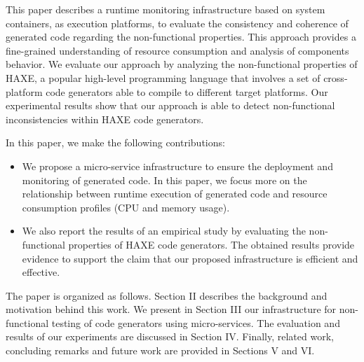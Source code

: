 This paper describes a runtime monitoring infrastructure based on system containers, as execution platforms, to evaluate the consistency and coherence of generated code regarding the non-functional properties. This approach provides a fine-grained understanding of resource consumption and analysis of components behavior. 
We evaluate our approach by analyzing the non-functional properties of HAXE, a popular high-level programming language that involves a set of cross-platform code generators able to compile to different target platforms. Our experimental results show that our approach is able to detect non-functional inconsistencies within HAXE code generators.


In this paper, we make the following contributions:
\begin{itemize} 	
	
	\item We propose a micro-service infrastructure to ensure the deployment and monitoring of generated code. In this paper, we focus more on the relationship between runtime execution of generated code and resource consumption profiles (CPU and memory usage).
	\item We also report the results of an empirical study by evaluating the non-functional properties of HAXE code generators. The obtained results provide evidence to support the claim that our proposed infrastructure is efficient and effective.
	
	
\end{itemize}

The paper is organized as follows.
Section II describes the background and motivation behind this work. We present in Section III our infrastructure for non-functional testing of code generators using micro-services. 
The evaluation and results of our experiments are discussed in Section IV. 
Finally, related work, concluding remarks and future work are provided in Sections V and VI.





